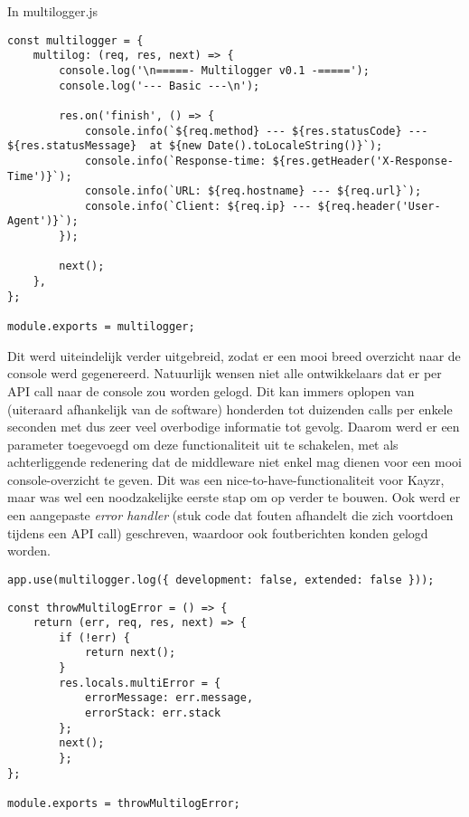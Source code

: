 \begin{minipage}{\linewidth}
	In multilogger.js
\begin{lstlisting}[style=ES6, caption={multilogger.js eerste stap},label=code:multilogFirst]
const multilogger = {
	multilog: (req, res, next) => {
		console.log('\n=====- Multilogger v0.1 -=====');
		console.log('--- Basic ---\n');
		
		res.on('finish', () => {
			console.info(`${req.method} --- ${res.statusCode} ---  ${res.statusMessage}  at ${new Date().toLocaleString()}`);
			console.info(`Response-time: ${res.getHeader('X-Response-Time')}`);
			console.info(`URL: ${req.hostname} --- ${req.url}`);
			console.info(`Client: ${req.ip} --- ${req.header('User-Agent')}`);
		});
		
		next();
	},
};

module.exports = multilogger; 
\end{lstlisting}
\end{minipage}

Dit werd uiteindelijk verder uitgebreid, zodat er een mooi breed overzicht naar de console werd gegenereerd. Natuurlijk wensen niet alle ontwikkelaars dat er per API call naar de console zou worden gelogd. Dit kan immers oplopen van (uiteraard afhankelijk van de software) honderden tot duizenden calls per enkele seconden met dus zeer veel overbodige informatie tot gevolg. Daarom werd er een parameter toegevoegd om deze functionaliteit uit te schakelen, met als achterliggende redenering dat de middleware niet enkel mag dienen voor een mooi console-overzicht te geven. Dit was een nice-to-have-functionaliteit voor Kayzr, maar was wel  een noodzakelijke eerste stap om op verder te bouwen. Ook werd er een aangepaste \textit{error handler} (stuk code dat fouten afhandelt die zich voortdoen tijdens een API call) geschreven, waardoor ook foutberichten konden gelogd worden.

\begin{lstlisting}[style=ES6, caption={Parameters toegevoegd},label=code:multilogparams]
app.use(multilogger.log({ development: false, extended: false }));
\end{lstlisting}

\begin{minipage}{\linewidth}
\begin{lstlisting}[style=ES6, caption={MultiError.js, de custom error handler},label=code:multiError]
const throwMultilogError = () => {
	return (err, req, res, next) => {
		if (!err) {
			return next();
		}
		res.locals.multiError = {
			errorMessage: err.message,
			errorStack: err.stack
		};
		next();
		};
};

module.exports = throwMultilogError;
\end{lstlisting}
\end{minipage}

